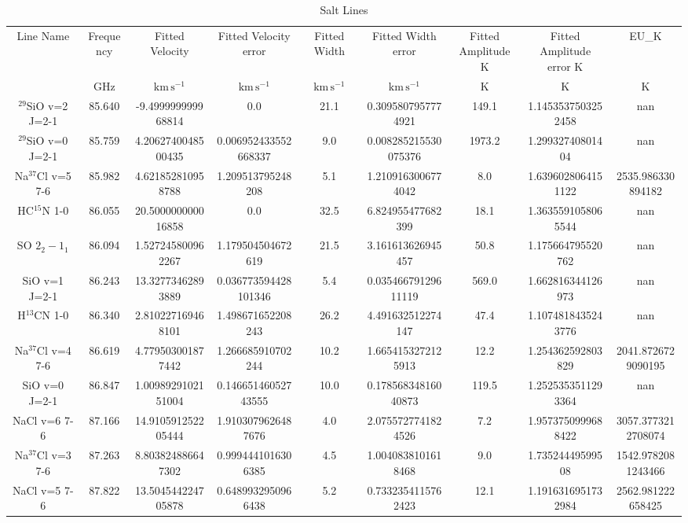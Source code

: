\begin{table*}[htp]
\centering
\caption{Salt Lines}
\begin{tabular}{ccccccccc}
\label{tab:salt_lines}
Line Name & Frequency & Fitted Velocity & Fitted Velocity error & Fitted Width & Fitted Width error & Fitted Amplitude K & Fitted Amplitude error K & EU_K \\
 & $\mathrm{GHz}$ & $\mathrm{km\,s^{-1}}$ & $\mathrm{km\,s^{-1}}$ & $\mathrm{km\,s^{-1}}$ & $\mathrm{km\,s^{-1}}$ & $\mathrm{K}$ & $\mathrm{K}$ & $\mathrm{K}$ \\
\hline
$^{29}$SiO v=2 J=2-1 & 85.640 & -9.499999999968814 & 0.0 & 21.1 & 0.3095807957774921 & 149.1 & 1.1453537503252458 & nan \\
$^{29}$SiO v=0 J=2-1 & 85.759 & 4.2062740048500435 & 0.006952433552668337 & 9.0 & 0.008285215530075376 & 1973.2 & 1.29932740801404 & nan \\
Na$^{37}$Cl v=5 7-6 & 85.982 & 4.621852810958788 & 1.209513795248208 & 5.1 & 1.2109163006774042 & 8.0 & 1.6396028064151122 & 2535.986330894182 \\
HC$^{15}$N 1-0 & 86.055 & 20.500000000016858 & 0.0 & 32.5 & 6.824955477682399 & 18.1 & 1.3635591058065544 & nan \\
SO $2_2-1_1$ & 86.094 & 1.527245800962267 & 1.179504504672619 & 21.5 & 3.161613626945457 & 50.8 & 1.175664795520762 & nan \\
SiO v=1 J=2-1 & 86.243 & 13.32773462893889 & 0.036773594428101346 & 5.4 & 0.03546679129611119 & 569.0 & 1.662816344126973 & nan \\
H$^{13}$CN 1-0 & 86.340 & 2.810227169468101 & 1.498671652208243 & 26.2 & 4.491632512274147 & 47.4 & 1.1074818435243776 & nan \\
Na$^{37}$Cl v=4 7-6 & 86.619 & 4.779503001877442 & 1.266685910702244 & 10.2 & 1.6654153272125913 & 12.2 & 1.254362592803829 & 2041.8726729090195 \\
SiO v=0 J=2-1 & 86.847 & 1.0098929102151004 & 0.14665146052743555 & 10.0 & 0.17856834816040873 & 119.5 & 1.2525353511293364 & nan \\
NaCl v=6 7-6 & 87.166 & 14.910591252205444 & 1.9103079626487676 & 4.0 & 2.0755727741824526 & 7.2 & 1.9573750999688422 & 3057.3773212708074 \\
Na$^{37}$Cl v=3 7-6 & 87.263 & 8.803824886647302 & 0.9994441016306385 & 4.5 & 1.0040838101618468 & 9.0 & 1.73524449599508 & 1542.9782081243466 \\
NaCl v=5 7-6 & 87.822 & 13.504544224705878 & 0.6489932950966438 & 5.2 & 0.7332354115762423 & 12.1 & 1.1916316951732984 & 2562.981222658425 \\

\end{tabular}
\end{table*}

